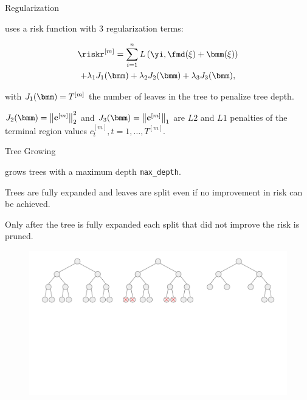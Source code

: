 \begin{frame}{Regularization}

   uses a risk function with 3 regularization terms:

  \begin{multline*}
    \riskr^{[m]} = \sum_{i=1}^{n} L\left(\yi, \fmd(\xi) + \bmm(\xi)\right)\\
     + \lambda_1 J_1(\bmm) + \lambda_2 J_2(\bmm) + \lambda_3 J_3(\bmm),
  \end{multline*}

  \lz

  with $J_1(\bmm) = T^{[m]}$ the number of leaves in the tree to penalize tree depth.

  \lz

  $J_2(\bmm) = \left\|\mathbf{c}^{[m]}\right\|^2_2$ and $J_3(\bmm) = \left\|\mathbf{c}^{[m]}\right\|_1$ are $L2$ and $L1$ penalties of the terminal region values $c_t^{[m]}, t=1,\dots,T^{[m]}$.

\end{frame}


\begin{vbframe}{Tree Growing}

   grows trees with a maximum depth \texttt{max\_depth}.

  \lz

  Trees are fully expanded and leaves are split even if no improvement in risk can be achieved.

  \lz

  Only after the tree is fully expanded each split that did not improve the risk is pruned.

  \begin{figure}
    \includegraphics[trim=0 260 230 20, clip, width=\textwidth,page=2]{figure_man/trees_balance.pdf}
  \end{figure}


\end{vbframe}

